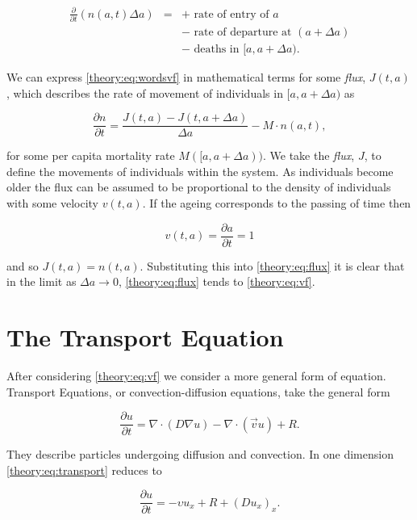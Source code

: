 \documentclass[../main.tex]{subfiles}
\begin{document}
  \begin{eqnarray}\label{theory:eq:wordsvf}
    \frac{\partial}{\partial t} \left( n(a, t) \Delta a \right)
    &=& + \mbox{ rate of entry of } a \nonumber \\
    && - \mbox{ rate of departure at } (a + \Delta a) \nonumber \\
    && - \mbox{ deaths in } [a, a + \Delta a).
  \end{eqnarray}

  We can express \autoref{theory:eq:wordsvf} in mathematical terms for some \emph{flux}, $J(t, a)$, which describes the rate of movement of individuals in $[a, a + \Delta a)$ as

  \begin{equation}\label{theory:eq:flux}
    \frac{\partial n}{\partial t} = \frac{J(t, a) - J(t, a + \Delta a)}{\Delta a} - M \cdot n(a, t),
  \end{equation}

  for some per capita mortality rate $M([a, a + \Delta a))$. We take the \emph{flux}, $J$, to define the movements of individuals within the system. As individuals become older the flux can be assumed to be proportional to the density of individuals with some velocity $v(t, a)$. If the ageing corresponds to the passing of time then

  $$ v(t, a) = \frac{\partial a}{\partial t} = 1$$

  and so $J(t, a) = n(t, a)$. Substituting this into \autoref{theory:eq:flux} it is clear that in the limit as $\Delta a \to 0$, \autoref{theory:eq:flux} tends to \autoref{theory:eq:vf}.

  \section{The Transport Equation}\label{theory:sec:transport}
  After considering \autoref{theory:eq:vf} we consider a more general form of equation. Transport Equations, or convection-diffusion equations, take the general form

  \begin{equation}\label{theory:eq:transport}
    \frac{\partial u}{\partial t} = \nabla \cdot (D \nabla u) - \nabla \cdot (\vec{v} u) + R.
  \end{equation}

  They describe particles undergoing diffusion and convection. In one dimension \autoref{theory:eq:transport} reduces to

  \begin{equation}\label{theory:eq:transport1d}
    \frac{\partial u}{\partial t} = - \upsilon u_x + R + (D u_x)_x.
  \end{equation}
\end{document}
